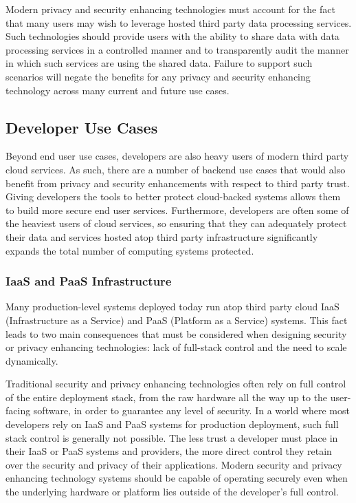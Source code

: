Modern privacy and security enhancing technologies must account for
the fact that many users may wish to leverage hosted third party data
processing services. Such technologies should provide users with the
ability to share data with data processing services in a controlled
manner and to transparently audit the manner in which such services
are using the shared data. Failure to support such scenarios will
negate the benefits for any privacy and security enhancing technology
across many current and future use cases.

\subsection{Developer Use Cases}

Beyond end user use cases, developers are also heavy users of modern
third party cloud services. As such, there are a number of backend use
cases that would also benefit from privacy and security enhancements
with respect to third party trust. Giving developers the tools to
better protect cloud-backed systems allows them to build more secure
end user services. Furthermore, developers are often some of the
heaviest users of cloud services, so ensuring that they can adequately
protect their data and services hosted atop third party infrastructure
significantly expands the total number of computing systems protected.

\subsubsection{IaaS and PaaS Infrastructure}

Many production-level systems deployed today run atop third party
cloud IaaS (Infrastructure as a Service) and PaaS (Platform as a
Service) systems. This fact leads to two main consequences that must
be considered when designing security or privacy enhancing
technologies: lack of full-stack control and the need to scale
dynamically.

Traditional security and privacy enhancing technologies often rely on
full control of the entire deployment stack, from the raw hardware all
the way up to the user-facing software, in order to guarantee any
level of security. In a world where most developers rely on IaaS and
PaaS systems for production deployment, such full stack control is
generally not possible. The less trust a developer must place in their
IaaS or PaaS systems and providers, the more direct control they
retain over the security and privacy of their applications. Modern
security and privacy enhancing technology systems should be capable of
operating securely even when the underlying hardware or platform lies
outside of the developer's full control.

